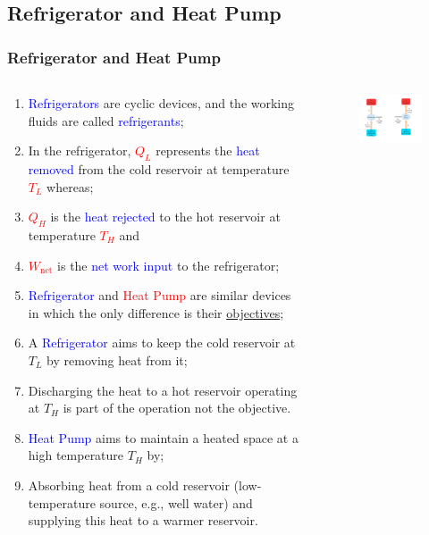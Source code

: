 \documentclass[10pt,compress]{beamer}
\begin{document}
\subsection{Refrigerator and Heat Pump}
\begin{frame}
 \frametitle{Refrigerator and Heat Pump}
  \begin{columns}
   \begin{column}[c]{0.45\linewidth}
    \begin{enumerate}[(1)]\scriptsize
     \item <1-> \textcolor{blue}{Refrigerators} are cyclic devices, and the working fluids are called \textcolor{blue}{refrigerants};
     \item <1-> In the refrigerator, \textcolor{red}{$Q_{L}$} represents the \textcolor{blue}{heat removed} from the cold reservoir at temperature \textcolor{red}{$T_{L}$} whereas;
     \item <1-> \textcolor{red}{$Q_{H}$} is the \textcolor{blue}{heat rejected} to the hot reservoir at temperature \textcolor{red}{$T_{H}$} and 
     \item <1-> \textcolor{red}{$W_{\text{net}}$} is the \textcolor{blue}{net work input} to the refrigerator;
     \item <1-> \textcolor{blue}{Refrigerator} and \textcolor{red}{Heat Pump} are similar devices in which the only difference is their \underline{objectives};
     \item <2-> A \textcolor{blue}{Refrigerator} aims to keep the cold reservoir at $T_{L}$ by removing heat from it;
     \item <2-> Discharging the heat to a hot reservoir operating at $T_{H}$ is part of the operation not the objective.
     \item <3-> \textcolor{blue}{Heat Pump} aims to maintain a heated space at a high temperature $T_{H}$ by;
     \item <3-> Absorbing heat from a cold reservoir (low-temperature source, e.g., well water) and supplying this heat to a warmer reservoir.
    \end{enumerate}
   \end{column}
   \begin{column}[c]{0.55\linewidth}
    \begin{figure}%
     \begin{center}
      \includegraphics[width=7.5cm,clip]{./Pics/Overview_Refrig2}

\end{center}
\end{figure}
\end{column}
\end{columns}
\end{frame}
\end{document}
